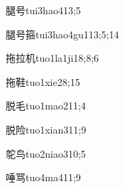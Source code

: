 \begin{verbete}{腿号}{tui3hao4}{13;5}
\end{verbete}

\begin{verbete}{腿号箍}{tui3hao4gu1}{13;5;14}
\end{verbete}

\begin{verbete}{拖拉机}{tuo1la1ji1}{8;8;6}
\end{verbete}

\begin{verbete}{拖鞋}{tuo1xie2}{8;15}
\end{verbete}

\begin{verbete}{脱毛}{tuo1mao2}{11;4}
\end{verbete}

\begin{verbete}{脱险}{tuo1xian3}{11;9}
\end{verbete}

\begin{verbete}{鸵鸟}{tuo2niao3}{10;5}
\end{verbete}

\begin{verbete}{唾骂}{tuo4ma4}{11;9}
\end{verbete}

